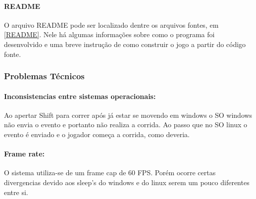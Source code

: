 \paragraph{\textbf{README}}

O arquivo README pode ser localizado dentre os arquivos fontes, em \ref{README}. Nele há algumas informações sobre como o programa foi desenvolvido e uma breve instrução de como construir o jogo a partir do código fonte.

\subsubsection{Problemas Técnicos}\label{problens}

\paragraph{\textbf{Inconsistencias entre sistemas operacionais:}}
Ao apertar Shift para correr após já estar se movendo em windows o SO windows 
não envia o evento e portanto não realiza a corrida. Ao passo que no SO linux o evento 
é enviado e o jogador começa a corrida, como deveria.

\paragraph{\textbf{Frame rate:}}
O sistema utiliza-se de um frame cap de 60 FPS. Porém ocorre certas divergencias 
devido aos sleep's do windows e do linux serem um pouco diferentes entre si.



